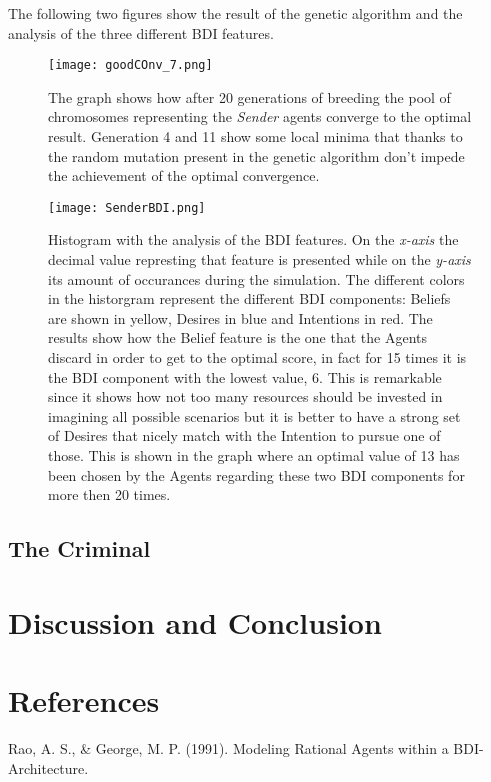 \documentclass[a4paper]{article}
\begin{document}
The following two figures show the result of the genetic algorithm and the analysis of the three different BDI features.

\begin{figure}[ht!]
   \texttt{[image: goodCOnv\_7.png]}
  \caption{The graph shows how after 20 generations of breeding the pool of chromosomes representing the \textit{Sender} agents converge to the optimal result. Generation 4 and 11 show some local minima that thanks to the random mutation present in the genetic algorithm don't impede the achievement of the optimal convergence.}\label{fig:awesome_image1}
\endminipage\hfill
{}
  \texttt{[image: SenderBDI.png]}
  \caption{Histogram with the analysis of the BDI features. On the \textit{x-axis} the decimal value represting that feature is presented while on the \textit{y-axis} its amount of occurances during the simulation. The different colors in the historgram represent the different BDI components: Beliefs are shown in yellow, Desires in blue and Intentions in red. The results show how the Belief feature is the one that the Agents discard in order to get to the optimal score, in fact for 15 times it is the BDI component with the lowest value, 6. This is remarkable since it shows how not too many resources should be invested in imagining all possible scenarios but it is better to have a strong set of Desires that nicely match with the Intention to pursue one of those. This is shown in the graph where an optimal value of 13 has been chosen by the Agents regarding these two BDI components for more then 20 times.}\label{fig:awesome_image2}
\endminipage\hfill
\end{figure}



\subsection{The Criminal}

\section{Discussion and Conclusion}


\section{References}

Rao, A. S., \& George, M. P. (1991). Modeling Rational Agents within a BDI-Architecture. \\
\end{document}
